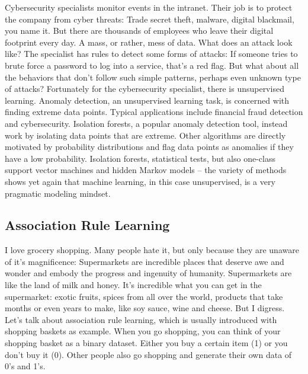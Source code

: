 \documentclass[
  10pt,
]{scrbook}
\begin{document}
Cybersecurity specialists monitor events in the intranet.
Their job is to protect the company from cyber threats: Trade secret theft, malware, digital blackmail, you name it.
But there are thousands of employees who leave their digital footprint every day.
A mass, or rather, mess of data.
What does an attack look like?
The specialist has rules to detect some forms of attacks:
If someone tries to brute force a password to log into a service, that's a red flag.
But what about all the behaviors that don't follow such simple patterns, perhaps even unknown type of attacks?
Fortunately for the cybersecurity specialist, there is unsupervised learning.
Anomaly detection, an unsupervised learning task, is concerned with finding extreme data points.
Typical applications include financial fraud detection and cybersecurity.
Isolation forests, a popular anomaly detection tool, instead work by isolating data points that are extreme.
Other algorithms are directly motivated by probability distributions and flag data points as anomalies if they have a low probability.
Isolation forests, statistical tests, but also one-class support vector machines and hidden Markov models -- the variety of methods shows yet again that machine learning, in this case unsupervised, is a very pragmatic modeling mindset.

\hypertarget{association-rule-learning}{%
\subsection{Association Rule Learning}\label{association-rule-learning}}

I love grocery shopping.
Many people hate it, but only because they are unaware of it's magnificence:
Supermarkets are incredible places that deserve awe and wonder and embody the progress and ingenuity of humanity.
Supermarkets are like the land of milk and honey.
It's incredible what you can get in the supermarket: exotic fruits, spices from all over the world, products that take months or even years to make, like soy sauce, wine and cheese.
But I digress.
Let's talk about association rule learning, which is usually introduced with shopping baskets as example.
When you go shopping, you can think of your shopping basket as a binary dataset.
Either you buy a certain item (1) or you don't buy it (0).
Other people also go shopping and generate their own data of 0's and 1's.
\end{document}
